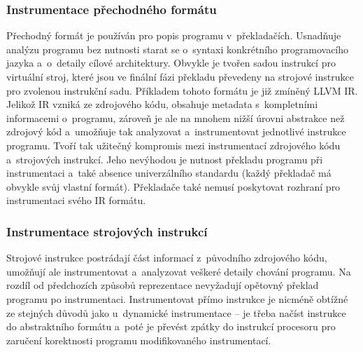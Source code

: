 \subsubsection*{Instrumentace přechodného formátu}
Přechodný formát je používán pro popis programu v~překladačích. Usnadňuje analýzu programu bez nutnosti starat se o~syntaxi konkrétního programovacího jazyka a~o~detaily cílové architektury. Obvykle je tvořen sadou instrukcí pro virtuální stroj, které jsou ve finální fázi překladu převedeny na strojové instrukce pro zvolenou instrukční sadu. Příkladem tohoto formátu je již zmíněný LLVM IR. Jelikož IR vzniká ze zdrojového kódu, obsahuje metadata s~kompletními informacemi o~programu, zároveň je ale na mnohem nižší úrovni abstrakce než zdrojový kód a~umožňuje tak analyzovat a~instrumentovat jednotlivé instrukce programu. Tvoří tak užitečný kompromis mezi instrumentací zdrojového kódu a~strojových instrukcí. Jeho nevýhodou je nutnost překladu programu při instrumentaci a~také absence univerzálního standardu (každý překladač má obvykle svůj vlastní formát). Překladače také nemusí poskytovat rozhraní pro instrumentaci svého IR formátu.

\subsubsection*{Instrumentace strojových instrukcí}
Strojové instrukce postrádají část informací z~původního zdrojového kódu, umožňují ale instrumentovat a~analyzovat veškeré detaily chování programu. Na rozdíl od předchozích způsobů reprezentace nevyžadují opětovný překlad programu po instrumentaci. Instrumentovat přímo instrukce je nicméně obtížné ze stejných důvodů jako u~dynamické instrumentace -- je třeba načíst instrukce do abstraktního formátu a~poté je převést zpátky do instrukcí procesoru pro zaručení korektnosti programu modifikovaného instrumentací.
